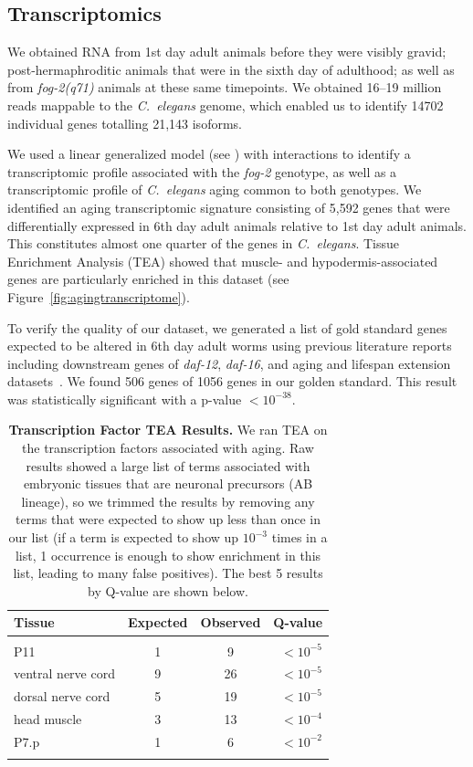 \documentclass[10pt,letterpaper,twocolumn]{article}
\newcommand{\cel}{\emph{C.~elegans}}
\newcommand{\fog}{\emph{fog-2}}
\newcommand{\agen}{5,592}
\newcommand{\goldn}{1056}
\newcommand{\goldfound}{506}
\newcommand{\goldpval}{$<10^{-38}$}
\newcommand{\ra}[1]{\renewcommand{\arraystretch}{#1}}
\begin{document}
\subsection*{Transcriptomics}
\label{sub:Transcriptomics}

We obtained RNA from 1st day adult animals before they were visibly gravid; post-hermaphroditic animals that were in the sixth day of adulthood; as well as from \fog{}\emph{(q71)} animals at these same timepoints. We obtained 16--19 million reads mappable to the \cel{} genome, which enabled us to identify 14702 individual genes totalling 21,143 isoforms.

We used a linear generalized model (see ) with interactions to identify a transcriptomic profile associated with the \fog{} genotype, as well as a transcriptomic profile of \cel{} aging common to both genotypes. We identified an aging transcriptomic signature consisting of \agen{} genes that were differentially expressed in 6th day adult animals relative to 1st day adult animals. This constitutes almost one quarter of the genes in \cel{}. Tissue Enrichment Analysis (TEA) showed that muscle- and hypodermis-associated genes are particularly enriched in this dataset (see Figure~\ref{fig:agingtranscriptome}).

To verify the quality of our dataset, we generated a list of gold standard genes expected to be altered in 6th day adult worms using previous literature reports including downstream genes of \emph{daf-12}, \emph{daf-16}, and aging and lifespan extension datasets~\cite{Murphy2003,Halaschek-wiener2005,Lund2002,McCormick2012,Eckley2013}. We found \goldfound{} genes of \goldn{} genes in our golden standard. This result was statistically significant with a p-value \goldpval{}.

\begin{table}
\renewcommand{\familydefault}{\sfdefault}\normalfont{}
\centering{}
\ra{1.3}
\caption{\textbf{Transcription Factor TEA Results.} We ran TEA on the transcription factors associated with aging. Raw results showed a large list of terms associated with embryonic tissues that are neuronal precursors (AB lineage), so we trimmed the results by removing any terms that were expected to show up less than once in our list (if a term is expected to show up $10^{-3}$ times in a list, 1 occurrence is enough to show enrichment in this list, leading to many false positives). The best 5 results by Q-value are shown below.}
\begin{tabular}{@{}lccr@{}}
\toprule{}
Tissue & Expected & Observed & Q-value\\
\bottomrule{}\\
P11 & 1 & 9 & $<10^{-5}$\\
ventral nerve cord &	9 &	26 &	$<10^{-5}$\\
dorsal nerve cord &	5 &	19 & $<10^{-5}$\\
head muscle & 3	& 13 &	$<10^{-4}$\\
P7.p & 1 &	6	& $<10^{-2}$\\
\bottomrule{}
\end{tabular}
\label{tab:tea_tf_age}
\end{table}
\end{document}
